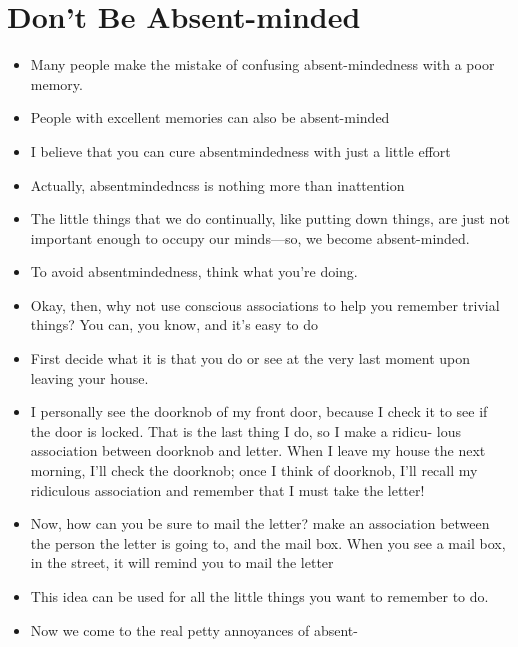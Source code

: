     \section* {Don't Be Absent-minded}
        \begin{itemize}
            \item Many people make the mistake of confusing absent-mindedness with a poor memory.
            \item People
            with excellent memories can also be absent-minded
            \item I believe that you can cure absentmindedness with just a
            little effort
            \item Actually, absentmindedncss is nothing more than inattention
            \item The little things
            that we do continually, like putting down things, are just
            not important enough to occupy our minds—so, we become
            absent-minded.
            \item To avoid absentmindedness,
            think what you're doing.
            \item Okay, then, why not use conscious associations to help you
            remember trivial things? You can, you know, and it's easy
            to do
            \item First decide what it is that you do or see at the very
            last moment upon leaving your house.
            \item I personally see the
            doorknob of my front door, because I check it to see if the
            door is locked.
                \subitem That is the last thing I do, so I make a ridicu-
                lous association between doorknob and letter.
                \subitem When I leave
                my house the next morning, I'll check the doorknob; once
                I think of doorknob, I'll recall my ridiculous association
                and remember that I must take the letter!
            \item Now, how can you be sure to mail the letter?
            \subitem make an association
            between the person the letter is going to, and the mail box.
            \subitem When you see a mail box, in
            the street, it will remind you to mail the letter
            \item This idea can be used for all the little things you want
            to remember to do.
            \item Now we come to the real petty annoyances of absent-

\end{itemize}

